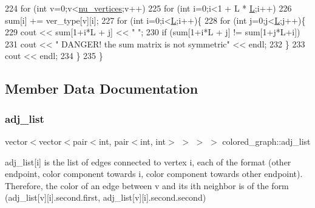 \begin{DoxyCode}
224   \textcolor{keywordflow}{for} (\textcolor{keywordtype}{int} v=0;v<\hyperlink{classcolored__graph_a90ece8eb1fec52f3f41549ab527c1d5b}{nu\_vertices};v++)
225     \textcolor{keywordflow}{for} (\textcolor{keywordtype}{int} i=0;i<1 + L * \hyperlink{classcolored__graph_ae159d1b15106b70a2eabef8884501e97}{L};i++)
226       sum[i] += ver\_type[v][i];
227   \textcolor{keywordflow}{for} (\textcolor{keywordtype}{int} i=0;i<\hyperlink{classcolored__graph_ae159d1b15106b70a2eabef8884501e97}{L};i++)\{
228     \textcolor{keywordflow}{for} (\textcolor{keywordtype}{int} j=0;j<\hyperlink{classcolored__graph_ae159d1b15106b70a2eabef8884501e97}{L};j++)\{
229       cout << sum[1+i*L + j] << \textcolor{stringliteral}{" "};
230       \textcolor{keywordflow}{if} (sum[1+i*L + j] != sum[1+j*L+i])
231         cout << \textcolor{stringliteral}{" DANGER! the sum matrix is not symmetric"} << endl;
232     \}
233     cout << endl;
234   \}
235 \}
\end{DoxyCode}


\subsection{Member Data Documentation}
\mbox{\label{classcolored__graph_a45dce16965079286cf3f41a54a1b2ea4}} 
\subsubsection{\texorpdfstring{adj\+\_\+list}{adj\_list}}
{\footnotesize\ttfamily vector$<$vector$<$pair$<$int, pair$<$int, int$>$ $>$ $>$ $>$ colored\+\_\+graph\+::adj\+\_\+list}



adj\+\_\+list\mbox{[}i\mbox{]} is the list of edges connected to vertex i, each of the format (other endpoint, color component towards i, color component towards other endpoint). Therefore, the color of an edge between v and its ith neighbor is of the form (adj\+\_\+list\mbox{[}v\mbox{]}\mbox{[}i\mbox{]}.second.\+first, adj\+\_\+list\mbox{[}v\mbox{]}\mbox{[}i\mbox{]}.second.\+second) 

\mbox{\label{classcolored__graph_ad657e7e86bee874d19dbc1765e1edaa7}} 
